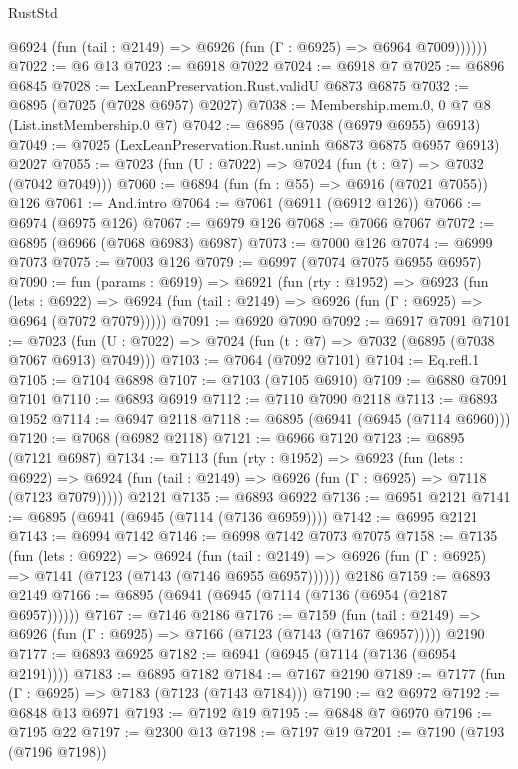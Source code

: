 \begin{lexlean}{RustStd}
\begin{coremodule}
          @6924 (fun (tail : @2149) => @6926 (fun (Γ : @6925) => @6964 @7009))))))
@7022 := @6 @13
@7023 := @6918 @7022
@7024 := @6918 @7
@7025 := @6896 @6845
@7028 := LexLeanPreservation.Rust.validU @6873 @6875
@7032 := @6895 (@7025 (@7028 @6957) @2027)
@7038 := Membership.mem.{0, 0} @7 @8 (List.instMembership.{0} @7)
@7042 := @6895 (@7038 (@6979 @6955) @6913)
@7049 := @7025 (LexLeanPreservation.Rust.uninh @6873 @6875 @6957 @6913) @2027
@7055 := @7023 (fun (U : @7022) => @7024 (fun (t : @7) => @7032 (@7042 @7049)))
@7060 := @6894 (fun (fn : @55) => @6916 (@7021 @7055)) @126
@7061 := And.intro
@7064 := @7061 (@6911 (@6912 @126))
@7066 := @6974 (@6975 @126)
@7067 := @6979 @126
@7068 := @7066 @7067
@7072 := @6895 (@6966 (@7068 @6983) @6987)
@7073 := @7000 @126
@7074 := @6999 @7073
@7075 := @7003 @126
@7079 := @6997 (@7074 @7075 @6955 @6957)
@7090 := fun (params : @6919) =>
  @6921
    (fun (rty : @1952) =>
    @6923
      (fun (lets : @6922) =>
      @6924 (fun (tail : @2149) => @6926 (fun (Γ : @6925) => @6964 (@7072 @7079)))))
@7091 := @6920 @7090
@7092 := @6917 @7091
@7101 := @7023 (fun (U : @7022) => @7024 (fun (t : @7) => @7032 (@6895 (@7038 @7067 @6913) @7049)))
@7103 := @7064 (@7092 @7101)
@7104 := Eq.refl.{1}
@7105 := @7104 @6898
@7107 := @7103 (@7105 @6910)
@7109 := @6880 @7091 @7101
@7110 := @6893 @6919
@7112 := @7110 @7090 @2118
@7113 := @6893 @1952
@7114 := @6947 @2118
@7118 := @6895 (@6941 (@6945 (@7114 @6960)))
@7120 := @7068 (@6982 @2118)
@7121 := @6966 @7120
@7123 := @6895 (@7121 @6987)
@7134 := @7113
    (fun (rty : @1952) =>
    @6923
      (fun (lets : @6922) =>
      @6924 (fun (tail : @2149) => @6926 (fun (Γ : @6925) => @7118 (@7123 @7079)))))
    @2121
@7135 := @6893 @6922
@7136 := @6951 @2121
@7141 := @6895 (@6941 (@6945 (@7114 (@7136 @6959))))
@7142 := @6995 @2121
@7143 := @6994 @7142
@7146 := @6998 @7142 @7073 @7075
@7158 := @7135
    (fun (lets : @6922) =>
    @6924
      (fun (tail : @2149) => @6926 (fun (Γ : @6925) => @7141 (@7123 (@7143 (@7146 @6955 @6957))))))
    @2186
@7159 := @6893 @2149
@7166 := @6895 (@6941 (@6945 (@7114 (@7136 (@6954 (@2187 @6957))))))
@7167 := @7146 @2186
@7176 := @7159
    (fun (tail : @2149) => @6926 (fun (Γ : @6925) => @7166 (@7123 (@7143 (@7167 @6957)))))
    @2190
@7177 := @6893 @6925
@7182 := @6941 (@6945 (@7114 (@7136 (@6954 @2191))))
@7183 := @6895 @7182
@7184 := @7167 @2190
@7189 := @7177 (fun (Γ : @6925) => @7183 (@7123 (@7143 @7184)))
@7190 := @2 @6972
@7192 := @6848 @13 @6971
@7193 := @7192 @19
@7195 := @6848 @7 @6970
@7196 := @7195 @22
@7197 := @2300 @13
@7198 := @7197 @19
@7201 := @7190 (@7193 (@7196 @7198))

\end{coremodule}
\end{lexlean}
